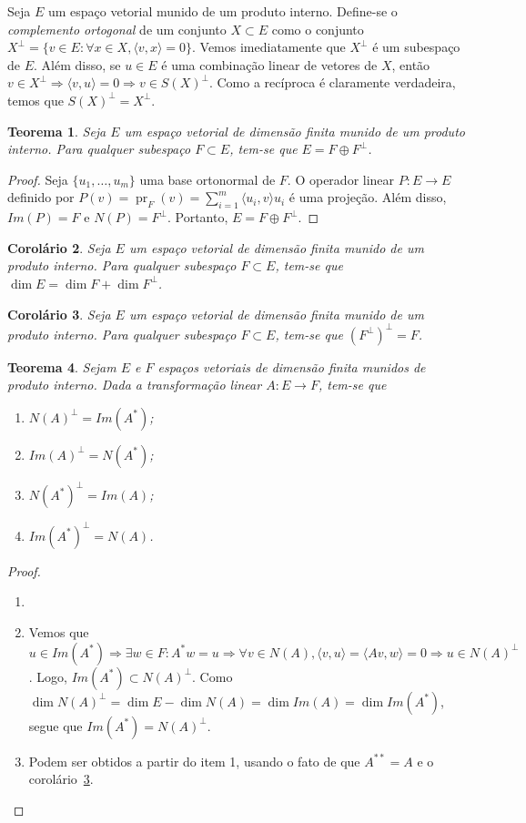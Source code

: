 \documentclass[12pt,a4paper]{article}
\newcommand{\ang}[1]{\langle#1\rangle}
\newtheorem{thm}{Teorema}[section]
\newtheorem{cor}[thm]{Corolário}
\theoremstyle{definition}
\DeclareMathOperator{\pr}{pr}
\begin{document}
Seja $E$ um espaço vetorial munido de um produto interno. Define-se o
\textit{complemento ortogonal} de um conjunto $X\subset E$ como o
conjunto $X^\perp=\{v\in E:\forall x\in X,\ang{v,x}=0\}$. Vemos
imediatamente que $X^\perp$ é um subespaço de $E$. Além disso, se
$u\in E$ é uma combinação linear de vetores de $X$, então
$v\in X^\perp\Rightarrow \ang{v,u}=0\Rightarrow v\in S(X)^\perp$. Como
a recíproca é claramente verdadeira, temos que $S(X)^\perp=X^\perp$.

\begin{thm}
  Seja $E$ um espaço vetorial de dimensão finita munido de um produto
  interno. Para qualquer subespaço $F\subset E$, tem-se que
  $E=F\oplus F^\perp$.
\end{thm}
\begin{proof}
  Seja $\{u_1,\ldots,u_m\}$ uma base ortonormal de $F$. O operador
  linear $P:E\to E$ definido por
  $P(v)=\pr_F(v)=\sum_{i=1}^m\ang{u_i,v}u_i$ é uma projeção. Além
  disso, $Im(P)=F$ e $N(P)=F^\perp$. Portanto, $E=F\oplus F^\perp$.
\end{proof}

\begin{cor}
  Seja $E$ um espaço vetorial de dimensão finita munido de um produto
  interno. Para qualquer subespaço $F\subset E$, tem-se que
  $\dim E=\dim F+\dim F^\perp$.
\end{cor}

\begin{cor}
  \label{thm:16}
  Seja $E$ um espaço vetorial de dimensão finita munido de um produto
  interno. Para qualquer subespaço $F\subset E$, tem-se que
  $(F^\perp)^\perp=F$.
\end{cor}

\begin{thm}
  Sejam $E$ e $F$ espaços vetoriais de dimensão finita munidos de
  produto interno. Dada a transformação linear $A:E\to F$, tem-se que
  \begin{enumerate}
  \item $N(A)^\perp=Im(A^*)$;
  \item $Im(A)^\perp=N(A^*)$;
  \item $N(A^*)^\perp=Im(A)$;
  \item $Im(A^*)^\perp=N(A)$.
  \end{enumerate}
\end{thm}
\begin{proof}
  \begin{enumerate}
  \item[]
  \item Vemos que
    $u\in Im(A^*)\Rightarrow \exists w\in F: A^*w=u\Rightarrow \forall
    v\in N(A),\ang{v,u}=\ang{Av,w}=0\Rightarrow u\in
    N(A)^\perp$. Logo, $Im(A^*)\subset N(A)^\perp$. Como
    $\dim N(A)^\perp=\dim E-\dim N(A)=\dim Im(A)=\dim Im(A^*)$, segue
    que $Im(A^*)=N(A)^\perp$.
  \item[2-4.] Podem ser obtidos a partir do item 1, usando o fato
    de que $A^{**}=A$ e o corolário~\ref{thm:16}.\qedhere
  \end{enumerate}
\end{proof}
\end{document}
